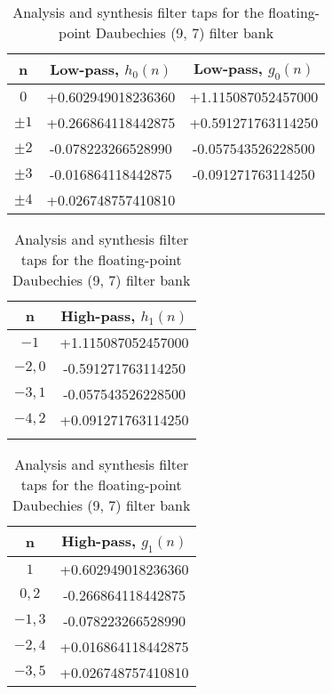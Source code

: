 \begin{table}
    \centering
    \caption{Analysis and synthesis filter taps for the floating-point Daubechies (9, 7) filter bank}
    \label{tab:anal_synth_97i}
\begin{tabular}{ccc}
    \toprule
    n         & Low-pass, $h_{0}(n)$ & Low-pass, $g_{0}(n)$ \\
    \midrule
    $0$       & +0.602949018236360  & +1.115087052457000  \\
    $\pm 1$   & +0.266864118442875  & +0.591271763114250  \\
    $\pm 2$   & -0.078223266528990  & -0.057543526228500  \\
    $\pm 3$   & -0.016864118442875  & -0.091271763114250  \\
    $\pm 4$   & +0.026748757410810  &                     \\
    \bottomrule
\end{tabular}

\bigskip
\bigskip


\begin{tabular}{cc}
    \toprule
    n         & High-pass, $h_{1}(n)$ \\
    \midrule
    $-1$      & +1.115087052457000   \\
    $-2, 0$   & -0.591271763114250   \\
    $-3, 1$   & -0.057543526228500   \\
    $-4, 2$   & +0.091271763114250   \\
              &                      \\
    \bottomrule
\end{tabular}
\quad
\begin{tabular}{cc}
    \toprule
    n        & High-pass, $g_{1}(n)$ \\
    \midrule
    $1$      & +0.602949018236360   \\
    $0, 2$   & -0.266864118442875   \\
    $-1, 3$  & -0.078223266528990   \\
    $-2, 4$  & +0.016864118442875   \\
    $-3, 5$  & +0.026748757410810   \\
    \bottomrule
\end{tabular}
\end{table}

